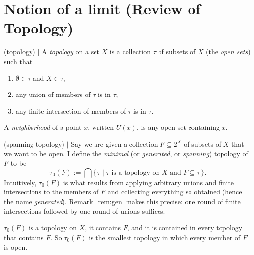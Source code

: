 \newpage
\section{Notion of a limit (Review of Topology) }



\begin{definition} (topology) $\mid$
A \emph{topology} on a set $X$ is a collection $\tau$ of subsets of $X$ (the
\emph{open sets}) such that
\begin{enumerate}[nosep,leftmargin=3em]
    \item $\emptyset \in \tau$ and $X \in \tau$,
    \item any union of members of $\tau$ is in $\tau$,
    \item any finite intersection of members of $\tau$ is in $\tau$.
\end{enumerate}
A \emph{neighborhood} of a point $x$, written $U(x)$, is any open set
containing $x$.
\end{definition}


\begin{definition} (spanning topology) $\mid$ \label{def:span}
Say we are given a collection $F\subseteq 2^X$ of subsets of $X$ that we want
to be open. I define the \emph{minimal} (or \emph{generated}, or
\emph{spanning}) topology of $F$ to be
\[
\tau_0(F) := \bigcap \big\{\, \tau \;\big|\; \tau \text{ is a topology on } X
\text{ and } F \subseteq \tau \,\big\}.
\]
Intuitively, $\tau_0(F)$ is what results from applying arbitrary unions and
finite intersections to the members of $F$ and collecting everything so
obtained (hence the name \emph{generated}). Remark~\ref{rem:gen} makes this
precise: one round of finite intersections
followed by one round of unions suffices.
\end{definition}

\begin{lemma} \label{lem:span}
$\tau_0(F)$ is a topology on $X$, it contains $F$, and it is contained in every
topology that contains $F$. So $\tau_0(F)$ is the smallest topology in which
every member of $F$ is open.
\end{lemma}

